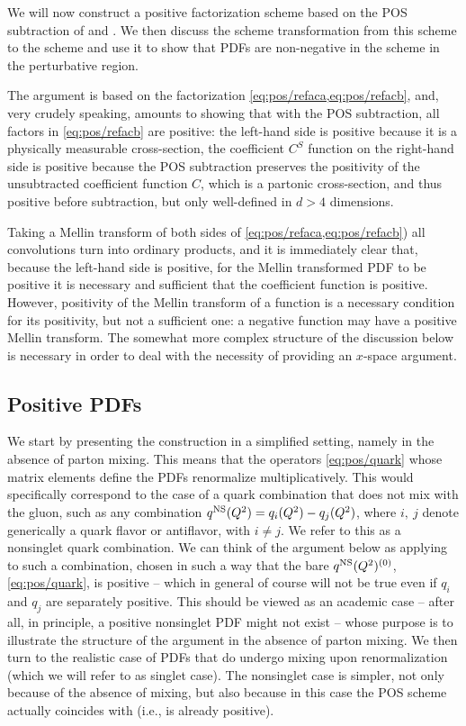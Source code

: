 
We will now construct a positive factorization scheme based on the POS 
subtraction of  and
.
We then discuss the scheme transformation from this scheme to the \msbar{}
scheme and use it to show that PDFs are non-negative in the \msbar{} scheme in
the perturbative region.

The argument is based on the factorization \cref{eq:pos/refaca,eq:pos/refacb},
and, very crudely speaking, amounts to showing that with the POS subtraction,
all factors in \cref{eq:pos/refacb} are positive: the left-hand side is
positive because it is a physically measurable cross-section, the coefficient
$C^S$ function on the right-hand side is positive because the POS subtraction
preserves the positivity of the unsubtracted coefficient function $C$, which is
a partonic cross-section, and thus positive before subtraction, but only
well-defined in $d>4$ dimensions.

Taking a Mellin transform of both sides of \cref{eq:pos/refaca,eq:pos/refacb})
all convolutions turn into ordinary products, and it is immediately clear that,
because the left-hand side is positive, for the Mellin transformed PDF to be
positive it is necessary and sufficient that the coefficient  function is
positive. 
However,  positivity of the Mellin transform of a function is a necessary
condition for its positivity, but not a sufficient one: a negative function may
have a positive Mellin transform. The somewhat more complex structure of the
discussion below is necessary in order to deal with the necessity of providing
an $x$-space argument.


\subsection{Positive PDFs}
\label{sec:pos/pospdf}

We start by presenting the construction in a simplified setting,  namely in the
absence of parton mixing. 
This means that the operators \cref{eq:pos/quark} whose matrix elements
define the PDFs renormalize multiplicatively.
This would specifically correspond to the case of a quark combination that does
not mix with the gluon, such as  any combination
$q^{{\textrm{NS}}}(Q^2)=q_i(Q^2)-q_j(Q^2)$, where $i,\>j$ denote generically a quark
flavor or antiflavor, with $i\not= j$.
We refer to this as a  nonsinglet quark combination. We can think of the
argument below as applying to such a combination,  chosen in such a way that 
the bare $q^{{\textrm{NS}}}(Q^2)^{(0)}$, \cref{eq:pos/quark}, is positive -- which
in general of course will not be true even if $q_i$ and $q_j$ are separately
positive. 
This should be viewed as an academic case -- after all, in principle, a
positive nonsinglet PDF might not exist -- whose purpose is to illustrate the
structure of the argument in the absence of parton mixing. 
We then turn to the realistic case of PDFs that do undergo mixing upon
renormalization (which we will refer to as singlet case).
The nonsinglet case is simpler, not only because of the absence of mixing, but
also because in  this case the POS scheme actually coincides with \msbar{}
(i.e., \msbar{} is already positive). 

